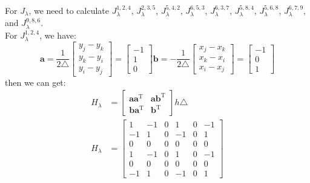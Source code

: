 \documentclass{article}
\begin{document}
For $J_{\lambda}$, we need to calculate $J^{1,2,4}_{\lambda}$, $J^{2,3,5}_{\lambda}$, $J^{5,4,2}_{\lambda}$, $J^{6,5,3}_{\lambda}$, $J^{6,3,7}_{\lambda}$, $J^{5,8,4}_{\lambda}$, $J^{5,6,8}_{\lambda}$, $J^{6,7,9}_{\lambda}$, and $J^{9,8,6}_{\lambda}$.\\
For $J^{1,2,4}_{\lambda}$, we have:
\begin{equation}
  \boldsymbol{a}=\frac{1}{2 \triangle}\left[\begin{array}{l}
  y_j-y_k \\
  y_k-y_i \\
  y_i-y_j
  \end{array}\right]
  =\left[\begin{array}{l}
    -1 \\
    1 \\
    0
    \end{array}\right]
    \boldsymbol{b}= - \frac{1}{2 \triangle}\left[\begin{array}{l}
      x_j-x_k \\
      x_k-x_i \\
      x_i-x_j
      \end{array}\right]
      =\left[\begin{array}{l}
        -1 \\
        0 \\
        1
        \end{array}\right]
\end{equation}
then we can get:
\begin{equation}
  \begin{aligned}
  H_\lambda & =\left[\begin{array}{ll}
  \boldsymbol{a} \boldsymbol{a}^{\mathrm{T}} & \boldsymbol{a} \boldsymbol{b}^{\mathrm{T}} \\
  \boldsymbol{b} \boldsymbol{a}^{\mathrm{T}} & \boldsymbol{b}^{\mathrm{T}}
  \end{array}\right] h \triangle \\
  H_\lambda & =\left[\begin{array}{ccc|ccc}
    1 & -1 & 0 & 1 & 0 & -1 \\
    -1 & 1 & 0 & -1 & 0 & 1 \\
    0 & 0 & 0 & 0 & 0 & 0 \\
    \hline 1 & -1 & 0 & 1 & 0 & -1 \\
    0 & 0 & 0 & 0 & 0 & 0 \\
    -1 & 1 & 0 & -1 & 0 & 1
    \end{array}\right]
  \end{aligned}
  \end{equation}
\end{document}
